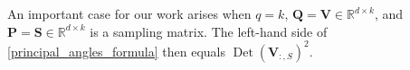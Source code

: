 \documentclass[twoside,11pt]{book}
\newtheorem{example}{Example}
\numberwithin{theorem}{chapter}
\numberwithin{definition}{chapter}
\numberwithin{proposition}{chapter}
\numberwithin{corollary}{chapter}
\numberwithin{example}{chapter}
\numberwithin{lemma}{chapter}
\numberwithin{assumption}{chapter}
\DeclareMathOperator{\Det}{Det}
\DeclareMathOperator{\Vol}{Vol}
\DeclareMathOperator{\Tran}{\intercal}
\newcommand{\ab}[1]{\textcolor{red}{#1}}
\begin{document}
An important case for our work arises when $q=k$, $\bm{Q}=\bm{V} \in \mathbb{R}^{d \times k}$, and $\bm{P}=\bm{S}\in \mathbb{R}^{d \times k}$ is a sampling matrix. The left-hand side of \eqref{principal_angles_formula} then equals $\Det(\bm{V}_{:,S})^2$.



%    
\end{document}
